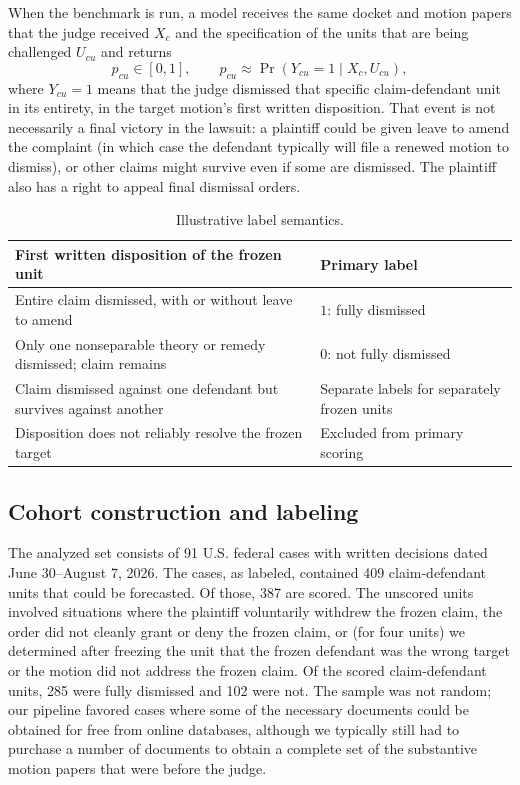\documentclass[11pt]{article}
\begin{document}
When the benchmark is run, a model receives the same docket and motion papers that the judge received $X_c$ and the specification of the units that are being challenged $U_{cu}$ and returns
\begin{equation}
 p_{cu}\in[0,1],\qquad p_{cu}\approx \Pr(Y_{cu}=1\mid X_c,U_{cu}),
\end{equation}
where $Y_{cu}=1$ means that the judge dismissed that specific claim-defendant unit in its entirety, in the target motion's first written disposition. That event is not necessarily a final victory in the lawsuit: a plaintiff could be given leave to amend the complaint (in which case the defendant typically will file a renewed motion to dismiss), or other claims might survive even if some are dismissed. The plaintiff also has a right to appeal final dismissal orders.


\begin{table}[ht]
\centering\small
\begin{tabular}{p{.60\linewidth}p{.29\linewidth}}
\toprule
First written disposition of the frozen unit & Primary label \\
\midrule
Entire claim dismissed, with or without leave to amend & $1$: fully dismissed \\
Only one nonseparable theory or remedy dismissed; claim remains & $0$: not fully dismissed \\
Claim dismissed against one defendant but survives against another & Separate labels for separately frozen units \\
Disposition does not reliably resolve the frozen target & Excluded from primary scoring \\
\bottomrule
\end{tabular}
\caption{Illustrative label semantics.}
\label{tab:labels}
\end{table}

\subsection{Cohort construction and labeling}
The analyzed set consists of 91 U.S. federal cases with written decisions dated June 30--August 7, 2026. The cases, as labeled, contained 409 claim-defendant units that could be forecasted. Of those, 387 are scored. The unscored units involved situations where the plaintiff voluntarily withdrew the frozen claim, the order did not cleanly grant or deny the frozen claim, or (for four units) we determined after freezing the unit that the frozen defendant was the wrong target or the motion did not address the frozen claim. Of the scored claim-defendant units, 285 were fully dismissed and 102 were not. The sample was not random; our pipeline favored cases where some of the necessary documents could be obtained for free from online databases, although we typically still had to purchase a number of documents to obtain a complete set of the substantive motion papers that were before the judge.
\end{document}
